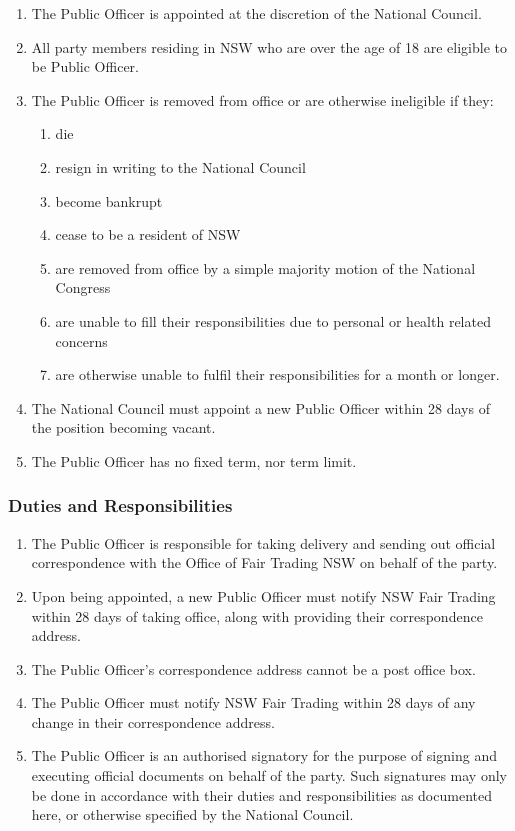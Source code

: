 \documentclass[a4paper,titlepage,8.5pt]{article}
\begin{document}
\begin{enumerate}
\item The Public Officer is appointed at the discretion of the National Council.
\item All party members residing in NSW who are over the age of 18 are eligible to be Public Officer.
\item The Public Officer is removed from office or are otherwise ineligible if they:
\begin{enumerate}
\item die
\item resign in writing to the National Council
\item become bankrupt
\item cease to be a resident of NSW
\item are removed from office by a simple majority motion of the National Congress
\item are unable to fill their responsibilities due to personal or health related concerns
\item are otherwise unable to fulfil their responsibilities for a month or longer.
\end{enumerate}
\item The National Council must appoint a new Public Officer within 28 days of the position becoming vacant.
\item The Public Officer has no fixed term, nor term limit.
\end{enumerate}

\subsubsection{Duties and Responsibilities}

\begin{enumerate}
\item The Public Officer is responsible for taking delivery and sending out official correspondence with the Office of Fair Trading NSW on behalf of the party.
\item Upon being appointed, a new Public Officer must notify NSW Fair Trading within 28 days of taking office, along with providing their correspondence address.
\item The Public Officer's correspondence address cannot be a post office box.
\item The Public Officer must notify NSW Fair Trading within 28 days of any change in their correspondence address.
\item The Public Officer is an authorised signatory for the purpose of signing and executing official documents on behalf of the party. Such signatures may only be done in accordance with their duties and responsibilities as documented here, or otherwise specified by the National Council.
\end{enumerate}
\end{document}
